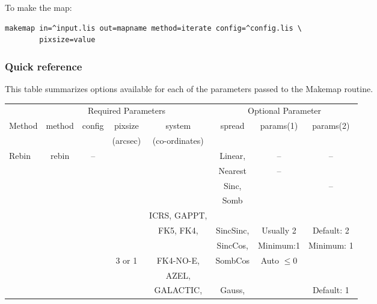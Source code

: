 \documentclass[twoside,11pt]{article}
\renewcommand{\_}{\texttt{\symbol{95}}}
\begin{document}
To make the map:
\begin{verbatim}
makemap in=^input.lis out=mapname method=iterate config=^config.lis \
        pixsize=value
\end{verbatim}


\subsubsection{Quick reference}

This table summarizes options available for each of the parameters
passed to the Makemap routine.

\begin{table}
\begin{tabular}{lccccccc}
\hline
        & \multicolumn{4}{c}{Required Parameters}           & \multicolumn{3}{c}{Optional Parameter} \\
Method & method    &  config   &    pixsize   &   system         &  spread    & params(1) & params(2) \\
       &           &           &   (arcsec)   &  (co-ordinates)  &            &           & \\
\hline
Rebin  & rebin     &  --       &              &                  &  Linear,   &   --      & -- \\
       &           &           &              &                  &  Nearest   &     --       & \\
       &           &           &              &                  &  Sinc,     &              &   -- \\
       &           &           &              &                  &  Somb      &              & \\
       &           &           &              &   ICRS, GAPPT,   &            &              & \\
       &           &           &              &   FK5, FK4,      &  SincSinc, &  Usually 2   &  Default: 2\\
       &           &           &              &                  &  SincCos,  &  Minimum:1   &  Minimum: 1\\
       &           &           &      3 or 1  &   FK4-NO-E,      &  SombCos   & Auto $\leq$0 & \\
       &           &           &              &   AZEL,          &            &              & \\
       &           &           &              &   GALACTIC,      &  Gauss,    &              &   Default: 1\\

\end{tabular}
\end{table}
\end{document}
